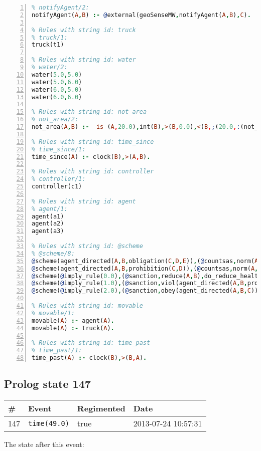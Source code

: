 \documentclass[11pt]{article}\usepackage[utf8]{inputenc}\usepackage{geometry}
\begin{document}
\begin{lstlisting}[language=Prolog, numbers=left]
% Rules with string id: notifyAgent
% notifyAgent/2:
notifyAgent(A,B) :- @external(geoSenseMW,notifyAgent(A,B),C).

% Rules with string id: truck
% truck/1:
truck(t1)

% Rules with string id: water
% water/2:
water(5.0,5.0)
water(5.0,6.0)
water(6.0,5.0)
water(6.0,6.0)

% Rules with string id: not_area
% not_area/2:
not_area(A,B) :-  is (A,20.0),int(B),>(B,0.0),<(B,;(20.0,:(not_area(A,B), is (-(B),20.0)))),int(A),>(A,0.0),<(A,;(20.0,:(area(A,B),-(int(A))))),int(B),>(A,0.0),>(B,0.0),<(A,21.0),<(B,21.0).

% Rules with string id: time_since
% time_since/1:
time_since(A) :- clock(B),>(A,B).

% Rules with string id: controller
% controller/1:
controller(c1)

% Rules with string id: agent
% agent/1:
agent(a1)
agent(a2)
agent(a3)

% Rules with string id: @scheme
% @scheme/8:
@scheme(agent_directed(A,B,obligation(C,D,E)),(@countsas,norm(A,B,F,obligation(C,D,E)),F),false,(listTrue(C)),(time_past(D)),false,[plus(viol(agent_directed(A,B,obligation(C,D,E))))|[]],[plus(obey(agent_directed(A,B,obligation(C,D,E))))|[]])
@scheme(agent_directed(A,B,prohibition(C,D)),(@countsas,norm(A,B,E,prohibition(C,D)),E),(listTrue(C)),false,(false),false,[plus(viol(agent_directed(A,B,prohibition(C,D))))|[]],[plus(obey(agent_directed(A,B,prohibition(C,D))))|[]])
@scheme(@imply_rule(0.0),(@sanction,reduce(A,B),do_reduce_health(A,B),notifyAgent(A,changed(status))),true,false,false,false,[min(reduce(A,B))|[]],[])
@scheme(@imply_rule(1.0),(@sanction,viol(agent_directed(A,B,prohibition(C,D))),do_sanction(D)),true,false,false,false,[min(viol(agent_directed(A,B,prohibition(C,D))))|[]],[])
@scheme(@imply_rule(2.0),(@sanction,obey(agent_directed(A,B,C))),true,false,false,false,[min(obey(agent_directed(A,B,C)))|[]],[])

% Rules with string id: movable
% movable/1:
movable(A) :- agent(A).
movable(A) :- truck(A).

% Rules with string id: time_past
% time_past/1:
time_past(A) :- clock(B),>(B,A).

\end{lstlisting}
\clearpage 
\subsection{Prolog state 147}
\begin{table}[ht]
\centering 
\begin{tabular}{l l l l} 
\textbf{\#} & \textbf{Event} & \textbf{Regimented} & \textbf{Date} \\ [0.5ex] 
\hline
147&\texttt{time(49.0)}&true&2013-07-24 10:57:31\\ [1ex] \hline\end{tabular}
\end{table}
The state after this event:
\end{document}
